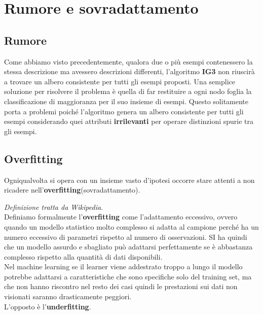 \section{Rumore e sovradattamento}
\subsection{Rumore}
Come abbiamo visto precedentemente, qualora due o più esempi contenessero la stessa descrizione ma avessero descrizioni differenti, l'algoritmo \textbf{IG3} non riuscirà a trovare un albero consistente per tutti gli esempi proposti. Una semplice soluzione per risolvere il problema è quella di far restituire a ogni nodo foglia la classificazione di maggioranza per il suo insieme di esempi. Questo solitamente porta a problemi poiché l'algoritmo genera un albero consistente per tutti gli esempi considerando quei attributi \textbf{irrilevanti} per operare distinzioni spurie tra gli esempi. 
\subsection{Overfitting}
Ogniqualvolta si opera con un insieme vasto d'ipotesi occorre stare attenti a non ricadere nell'\textbf{overfitting}(sovradattamento).
\begin{definizione}
  \textit{Definizione tratta da Wikipedia.}\\
  Definiamo formalmente l'\textbf{overfitting} come l'adattamento eccessivo,
  ovvero quando 
  un modello statistico molto complesso si adatta al campione perché ha un
  numero eccessivo di parametri rispetto al numero di osservazioni. SI ha
  quindi che un modello assurdo e sbagliato può adattarsi perfettamente se è
  abbastanza complesso rispetto alla quantità di dati disponibili.\\
  Nel machine learning se il learner viene addestrato troppo a lungo il modello
  potrebbe adattarsi a caratteristiche che sono specifiche solo del training
  set, ma che non hanno riscontro nel resto dei casi quindi le prestazioni sui
  dati non visionati saranno drasticamente peggiori.\\
  L'opposto è l'\textbf{underfitting}.
\end{definizione}

